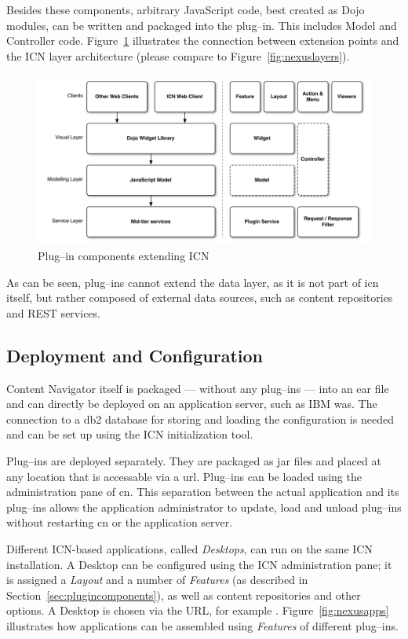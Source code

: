 Besides these components, arbitrary JavaScript code, best created as Dojo modules, can be written and packaged into the plug--in. This includes Model and Controller code. Figure~\ref{fig:plugincomponents} illustrates the connection between extension points and the ICN layer architecture (please compare to Figure~\ref{fig:nexuslayers}).

\begin{figure}[H]
	\centering
	\includegraphics[width=16cm]{images/plugincomponents.pdf}
	\caption{Plug--in components extending ICN}
	\label{fig:plugincomponents}
\end{figure}

As can be seen, plug--ins cannot extend the data layer, as it is not part of \acl{icn} itself, but rather composed of external data sources, such as content repositories and REST services.

\subsection{Deployment and Configuration}
Content Navigator itself is packaged --- without any plug--ins --- into an \ac{ear} file and can directly be deployed on an application server, such as IBM \acl{was}. The connection to a \gls{db2} database for storing and loading the configuration is needed and can be set up using the ICN initialization tool.

Plug--ins are deployed separately. They are packaged as \ac{jar} files and placed at any location that is accessable via a \ac{url}. Plug--ins can be loaded using the administration pane of \ac{cn}. This separation between the actual application and its plug--ins allows the application administrator to update, load and unload plug--ins without restarting \ac{cn} or the application server.

Different ICN-based applications, called \emph{Desktops}, can run on the same ICN installation. A Desktop can be configured using the ICN administration pane; it is assigned a \emph{Layout} and a number of \emph{Features} (as described in Section~\ref{sec:plugincomponents}), as well as content repositories and other options. A Desktop is chosen via the URL, for example . Figure~\ref{fig:nexusapps} illustrates how applications can be assembled using \emph{Features} of different plug--ins.

